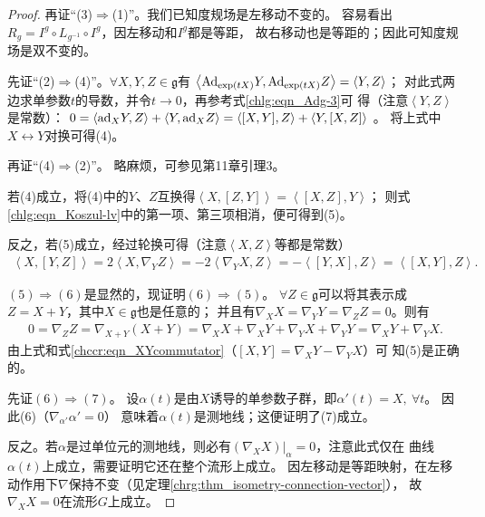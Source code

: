 \begin{proof}
    再证“(3)$\Rightarrow$(1)”。我们已知度规场是左移动不变的。
    容易看出$R_g = I^g\circ L_{g^{-1}}\circ I^g$，因左移动和$I^g$都是等距，
    故右移动也是等距的；因此可知度规场是双不变的。
    
    
    先证“(2)$\Rightarrow$(4)”。$\forall X,Y,Z\in \mathfrak{g}$有
    $\left<{\rm Ad}_{\exp(tX)}Y,{\rm Ad}_{\exp(tX)}Z\right>=\left<Y,Z\right>$；
    对此式两边求单参数$t$的导数，并令$t\to 0$，再参考式\eqref{chlg:eqn_Adg-3}可
    得（注意$\left<Y,Z\right>$是常数）：
    $ 0= \left<{\rm ad}_{X}Y,Z\right>+\left<Y,{\rm ad}_X Z\right>
    =\left<[X,Y],Z\right> + \left<Y,[X,Z]\right> $ 。
    将上式中$X\leftrightarrow Y$对换可得(4)。
    
    再证“(4)$\Rightarrow$(2)”。    略麻烦，可参见\parencite{oneill1983}第11章引理3。
    
    若(4)成立，将(4)中的$Y$、$Z$互换得$\left<X,[Z,Y]\right>=\left<[X,Z],Y\right>$；
    则式\eqref{chlg:eqn_Koszul-lv}中的第一项、第三项相消，便可得到(5)。
    
    反之，若(5)成立，经过轮换可得（注意$\left< X,Z\right>$等都是常数）
    \begin{align*}
        \left< X,[Y,Z]\right> = 2 \left<X, \nabla_Y Z \right> 
        =- 2 \left<\nabla_Y X, Z \right> 
        =- \left< [Y,X], Z \right> = \left< [X,Y], Z \right> .
    \end{align*}
    
    
    $(5)\Rightarrow (6)$是显然的，现证明$(6)\Rightarrow (5)$。
    $\forall Z\in \mathfrak{g}$可以将其表示成$Z=X+Y$，其中$X\in \mathfrak{g}$也是任意的；
    并且有$\nabla_X X =\nabla_Y Y =\nabla_Z Z =0$。则有
    \begin{align*}
        0=\nabla_Z Z =\nabla_{X+Y}(X+Y)= \nabla_X X+\nabla_X Y+\nabla_Y X+\nabla_Y Y
        =\nabla_X Y+\nabla_Y X .
    \end{align*}
    由上式和式\eqref{chccr:eqn_XYcommutator}（$\left[ {X,Y} \right] = \nabla_X Y - \nabla_Y X$）可
    知(5)是正确的。
    
    先证$(6)\Rightarrow (7)$。
    设$\alpha(t)$是由$X$诱导的单参数子群，即$\alpha'(t)=X,\ \forall t$。
    因此(6)（$\nabla_{\alpha'} \alpha'=0$）
    意味着$\alpha(t)$是测地线；这便证明了(7)成立。
    
    反之。若$\alpha$是过单位元的测地线，则必有$(\nabla_X X)|_{\alpha}=0$，注意此式仅在
    曲线$\alpha(t)$上成立，需要证明它还在整个流形上成立。
    因左移动是等距映射，在左移动作用下$\nabla$保持不变（见定理\ref{chrg:thm_isometry-connection-vector}），
    故$\nabla_X X=0$在流形$G$上成立。    
\end{proof}

